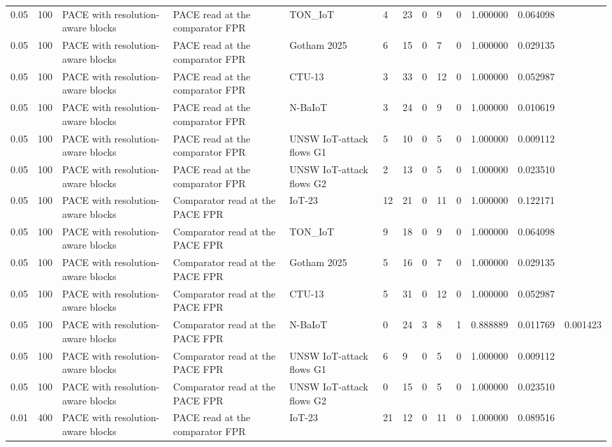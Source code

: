 \begin{tabular}{lllllllllllll}
0.05 & 100 & PACE with resolution-aware blocks & PACE read at the comparator FPR & TON\_IoT & 4 & 23 & 0 & 9 & 0 & 1.000000 & 0.064098 &  \\
0.05 & 100 & PACE with resolution-aware blocks & PACE read at the comparator FPR & Gotham 2025 & 6 & 15 & 0 & 7 & 0 & 1.000000 & 0.029135 &  \\
0.05 & 100 & PACE with resolution-aware blocks & PACE read at the comparator FPR & CTU-13 & 3 & 33 & 0 & 12 & 0 & 1.000000 & 0.052987 &  \\
0.05 & 100 & PACE with resolution-aware blocks & PACE read at the comparator FPR & N-BaIoT & 3 & 24 & 0 & 9 & 0 & 1.000000 & 0.010619 &  \\
0.05 & 100 & PACE with resolution-aware blocks & PACE read at the comparator FPR & UNSW IoT-attack flows G1 & 5 & 10 & 0 & 5 & 0 & 1.000000 & 0.009112 &  \\
0.05 & 100 & PACE with resolution-aware blocks & PACE read at the comparator FPR & UNSW IoT-attack flows G2 & 2 & 13 & 0 & 5 & 0 & 1.000000 & 0.023510 &  \\
0.05 & 100 & PACE with resolution-aware blocks & Comparator read at the PACE FPR & IoT-23 & 12 & 21 & 0 & 11 & 0 & 1.000000 & 0.122171 &  \\
0.05 & 100 & PACE with resolution-aware blocks & Comparator read at the PACE FPR & TON\_IoT & 9 & 18 & 0 & 9 & 0 & 1.000000 & 0.064098 &  \\
0.05 & 100 & PACE with resolution-aware blocks & Comparator read at the PACE FPR & Gotham 2025 & 5 & 16 & 0 & 7 & 0 & 1.000000 & 0.029135 &  \\
0.05 & 100 & PACE with resolution-aware blocks & Comparator read at the PACE FPR & CTU-13 & 5 & 31 & 0 & 12 & 0 & 1.000000 & 0.052987 &  \\
0.05 & 100 & PACE with resolution-aware blocks & Comparator read at the PACE FPR & N-BaIoT & 0 & 24 & 3 & 8 & 1 & 0.888889 & 0.011769 & 0.001423 \\
0.05 & 100 & PACE with resolution-aware blocks & Comparator read at the PACE FPR & UNSW IoT-attack flows G1 & 6 & 9 & 0 & 5 & 0 & 1.000000 & 0.009112 &  \\
0.05 & 100 & PACE with resolution-aware blocks & Comparator read at the PACE FPR & UNSW IoT-attack flows G2 & 0 & 15 & 0 & 5 & 0 & 1.000000 & 0.023510 &  \\
0.01 & 400 & PACE with resolution-aware blocks & PACE read at the comparator FPR & IoT-23 & 21 & 12 & 0 & 11 & 0 & 1.000000 & 0.089516 &  \\

\end{tabular}
